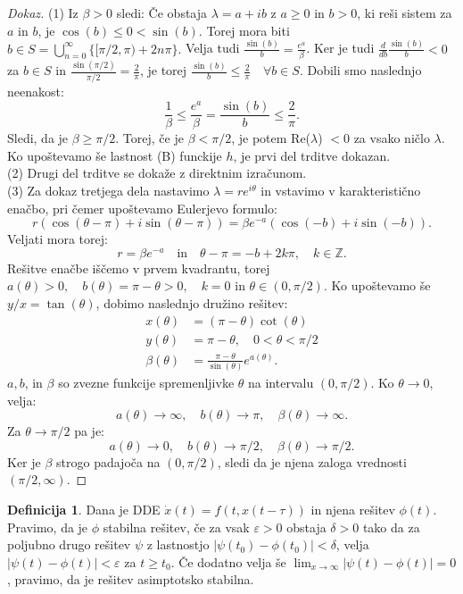 \documentclass[12pt,a4paper]{amsart}
\theoremstyle{definition} %
\newtheorem{definicija}{Definicija}[section]
\theoremstyle{plain} %
\newcommand{\Z}{\mathbb Z}
\begin{document}
\begin{proof}[Dokaz]
(1)  Iz $\beta > 0$ sledi: Če obstaja $\lambda = a +ib$ z $a \geq 0$ in $b > 0$, ki reši sistem za $a$ in $b$,
je $\cos(b) \leq 0 < \sin(b)$. Torej mora biti $b \in S = \bigcup_{n=0}^{\infty}\{[\pi / 2,\pi)+2n\pi\}.$ Velja
tudi $\frac{\sin(b)}{b}=\frac{e^{a}}{\beta}$. Ker je tudi $\frac{d}{db}\frac{\sin(b)}{b} < 0$ za $b \in S$
in $\frac{\sin(\pi /2)}{\pi / 2} = \frac{2}{\pi}$, je torej $\frac{\sin(b)}{b} \leq \frac{2}{\pi} \quad
\forall b \in S$.
Dobili smo naslednjo neenakost: 
\[\frac{1}{\beta} \leq \frac{e^a}{\beta} = \frac{\sin(b)}{b} \leq \frac{2}{\pi}.\]
Sledi, da je $\beta \geq \pi/2$. Torej, če je $\beta < \pi/2$, je potem Re($\lambda$) $<0$ za vsako ničlo
$\lambda$. Ko upoštevamo še lastnost (B) funckije $h$, je prvi del trditve dokazan. \\
(2)  Drugi del trditve se dokaže z direktnim izračunom. \\
(3)  Za dokaz tretjega dela nastavimo $\lambda = re^{i\theta}$ in vstavimo v karakteristično enačbo, pri čemer
upoštevamo Eulerjevo formulo:
\[ r(\cos(\theta - \pi)+i\sin(\theta - \pi))=\beta e^{-a}(\cos(-b)+i\sin(-b)).\]
Veljati mora torej:
\[r=\beta e^{-a} \quad \text{in} \quad \theta - \pi = -b + 2k\pi, \quad k \in \Z.\]
Rešitve enačbe iščemo v prvem kvadrantu, torej $a(\theta)>0,\quad b(\theta) = \pi - \theta > 0, \quad
k=0$ in $\theta \in (0,\pi/2)$. Ko upoštevamo še $y/x = \tan(\theta)$, dobimo naslednjo družino rešitev:
\begin{equation*}
    \begin{split}
        x(\theta) &= (\pi - \theta)\cot(\theta) \\
        y(\theta) &= \pi - \theta, \quad 0<\theta <\pi/2 \\
        \beta(\theta) &= \frac{\pi - \theta}{\sin(\theta)}e^{a(\theta)}. 
    \end{split}      
\end{equation*}
$a, b$, in $\beta$ so zvezne funkcije spremenljivke $\theta$ na intervalu $(0,\pi/2)$. Ko $\theta \to 0$,
velja:
\[ a(\theta) \to \infty, \quad b(\theta) \to \pi, \quad \beta(\theta) \to \infty.\]
Za $\theta \to \pi/2$ pa je:
\[a(\theta) \to 0, \quad b(\theta) \to \pi/2, \quad \beta(\theta) \to \pi/2.\]
Ker je $\beta$ strogo padajoča na $(0,\pi/2)$, sledi da je njena zaloga vrednosti $(\pi/2, \infty)$.
\end{proof}

\begin{definicija}
    Dana je DDE $\dot{x}(t)=f(t,x(t-\tau))$ in njena rešitev $\phi(t)$.
    Pravimo, da je $\phi$ stabilna rešitev, če 
    za vsak $\varepsilon > 0$ obstaja $\delta > 0$ tako da za poljubno drugo rešitev $\psi$ z lastnostjo
    $|\psi(t_0)-\phi(t_0)| < \delta$, velja $|\psi(t)-\phi(t)| < \varepsilon$ za $t \geq t_0$.
    Če dodatno velja
    še $\lim_{x \to \infty}|\psi(t)-\phi(t)|=0$, pravimo, da je rešitev asimptotsko stabilna.
\end{definicija}
\end{document}
